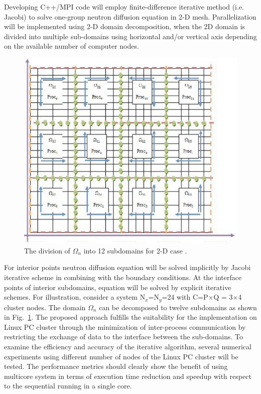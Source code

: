 \documentclass{anstrans}
\begin{document}
Developing C++/MPI code will employ finite-difference iterative method (i.e. Jacobi) to solve one-group neutron diffusion equation in 2-D mesh. Parallelization will be implemented using 2-D domain decomposition, when the 2D domain is divided
into multiple sub-domains using horizontal and/or vertical axis depending on the available number of computer nodes.

\begin{figure}[hbp!] %
  \centering
  \vspace{-0.3em}
  \includegraphics[width=0.85\linewidth]{domain_decomp.png}
  \caption{The division of $\Omega_n$ into 12 subdomains for 2-D case \cite{kirk2006}.}
  \vspace{-0.6em}
  \label{fig:domain_decomp}
\end{figure}
\FloatBarrier

For interior points neutron diffusion equation will be solved implicitly by Jacobi iterative scheme in combining with the boundary conditions. At the interface points of interior subdomains, equation will be solved by explicit iterative schemes. For illustration, consider a system N$_x$=N$_y$=24 with C=P$\times$Q = 3$\times$4 cluster nodes. The domain $\Omega_n$ can be decomposed to twelve subdomains as shown in Fig.~\ref{fig:domain_decomp}. The proposed approach fulfills the suitability for the implementation on Linux PC cluster through the minimization of inter-process communication by restricting the exchange of data to the interface between the sub-domains. To examine the efficiency and accuracy of the iterative algorithm, several numerical experiments using different number of nodes of the Linux PC cluster will be tested. The performance metrics should clearly show the benefit of using multicore system in terms of execution time reduction and speedup with respect to the sequential running in a single core.



\end{document}
